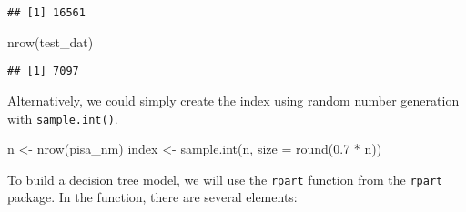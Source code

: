 \documentclass[
]{book}
\newenvironment{Shaded}{\begin{snugshade}}{\end{snugshade}}
\newcommand{\AttributeTok}[1]{\textcolor[rgb]{0.77,0.63,0.00}{#1}}
\newcommand{\CommentTok}[1]{\textcolor[rgb]{0.56,0.35,0.01}{\textit{#1}}}
\newcommand{\ConstantTok}[1]{\textcolor[rgb]{0.00,0.00,0.00}{#1}}
\newcommand{\DecValTok}[1]{\textcolor[rgb]{0.00,0.00,0.81}{#1}}
\newcommand{\FloatTok}[1]{\textcolor[rgb]{0.00,0.00,0.81}{#1}}
\newcommand{\FunctionTok}[1]{\textcolor[rgb]{0.00,0.00,0.00}{#1}}
\newcommand{\NormalTok}[1]{#1}
\newcommand{\OtherTok}[1]{\textcolor[rgb]{0.56,0.35,0.01}{#1}}
\newcommand{\SpecialCharTok}[1]{\textcolor[rgb]{0.00,0.00,0.00}{#1}}
\begin{document}
\begin{Shaded}
\end{Shaded}

\begin{verbatim}
## [1] 16561
\end{verbatim}

\begin{Shaded}
\begin{Highlighting}[]
\FunctionTok{nrow}\NormalTok{(test\_dat)}
\end{Highlighting}
\end{Shaded}

\begin{verbatim}
## [1] 7097
\end{verbatim}

Alternatively, we could simply create the index using random number generation with \texttt{sample.int()}.

\begin{Shaded}
\begin{Highlighting}[]
\NormalTok{n }\OtherTok{\textless{}{-}} \FunctionTok{nrow}\NormalTok{(pisa\_nm)}
\NormalTok{index }\OtherTok{\textless{}{-}} \FunctionTok{sample.int}\NormalTok{(n, }\AttributeTok{size =} \FunctionTok{round}\NormalTok{(}\FloatTok{0.7} \SpecialCharTok{*}\NormalTok{ n))}
\end{Highlighting}
\end{Shaded}

To build a decision tree model, we will use the \texttt{rpart} function from the \texttt{rpart} package. In the function, there are several elements:
\end{document}
